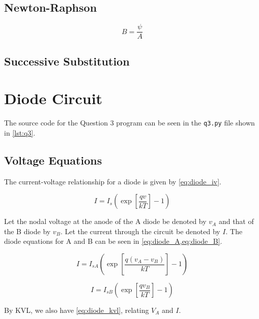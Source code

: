 \documentclass[a4paper,titlepage]{article}
\begin{document}
	\begin{equation} \label{eq:flux_plug}
		
	\end{equation}
	
	\subsection{Newton-Raphson}
	
	\begin{equation} \label{eq:b_psi}
		B = \frac{\psi}{A}
	\end{equation}
	
	\subsection{Successive Substitution}
	
	
	\section{Diode Circuit}
	The source code for the Question 3 program can be seen in the \texttt{q3.py} file shown in \cref{lst:q3}.
	
	\subsection{Voltage Equations}
	The current-voltage relationship for a diode is given by \cref{eq:diode_iv}.
	
	\begin{equation} \label{eq:diode_iv}
		I = I_s \left( \exp\left[{\frac{qv}{kT}}\right] - 1\right)
	\end{equation}
	
	Let the nodal voltage at the anode of the A diode be denoted by $v_A$ and that of the B diode by $v_B$. Let the current through the circuit be denoted by $I$. The diode equations for A and B can be seen in \cref{eq:diode_A,eq:diode_B}.
	
	\begin{equation} \label{eq:diode_A}
		I = I_{sA} \left( \exp\left[{\frac{q(v_A - v_B)}{kT}}\right] - 1\right)
	\end{equation}
	
	\begin{equation} \label{eq:diode_B}
		I = I_{sB} \left( \exp\left[{\frac{qv_B}{kT}}\right] - 1\right)
	\end{equation}
	
	By KVL, we also have \cref{eq:diode_kvl}, relating $V_A$ and $I$.
	
\end{document}
